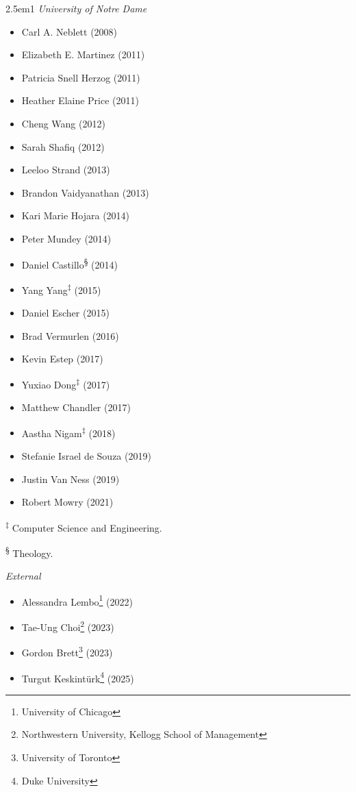 \documentclass[
]{article}
\providecommand{\tightlist}{%
  \setlength{\itemsep}{0pt}\setlength{\parskip}{0pt}}
\newenvironment{cventry}{\begin{hangparas}{2.5em}{1}}{\end{hangparas}}
\begin{document}
\begin{cventry}
\emph{University of Notre Dame}

\begin{itemize}
\tightlist
\item
  Carl A. Neblett (2008)
\item
  Elizabeth E. Martinez (2011)
\item
  Patricia Snell Herzog (2011)
\item
  Heather Elaine Price (2011)
\item
  Cheng Wang (2012)
\item
  Sarah Shafiq (2012)
\item
  Leeloo Strand (2013)
\item
  Brandon Vaidyanathan (2013)
\item
  Kari Marie Hojara (2014)
\item
  Peter Mundey (2014)
\item
  Daniel Castillo\textsuperscript{§} (2014)
\item
  Yang Yang\textsuperscript{‡} (2015)
\item
  Daniel Escher (2015)
\item
  Brad Vermurlen (2016)
\item
  Kevin Estep (2017)
\item
  Yuxiao Dong\textsuperscript{‡} (2017)
\item
  Matthew Chandler (2017)
\item
  Aastha Nigam\textsuperscript{‡} (2018)
\item
  Stefanie Israel de Souza (2019)
\item
  Justin Van Ness (2019)
\item
  Robert Mowry (2021)
\end{itemize}

\textsuperscript{‡} Computer Science and Engineering.

\textsuperscript{§} Theology.

\emph{External}

\begin{itemize}
\tightlist
\item
  Alessandra Lembo\footnote{University of Chicago} (2022)
\item
  Tae-Ung Choi\footnote{Northwestern University, Kellogg School of
    Management} (2023)
\item
  Gordon Brett\footnote{University of Toronto} (2023)
\item
  Turgut Keskintürk\footnote{Duke University} (2025)
\end{itemize}

\end{cventry}
\end{document}
